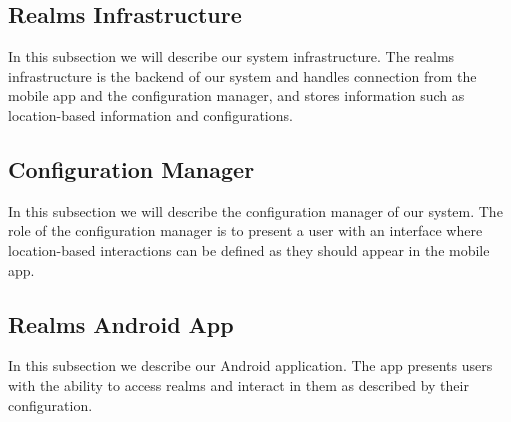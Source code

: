 
\subsection{Realms Infrastructure} %
\label{sub:realms_infrastructure}
In this subsection we will describe our system infrastructure. The realms infrastructure is the backend of our system and handles connection from the mobile app and the configuration manager, and stores information such as location-based information and configurations.

\subsection{Configuration Manager} %
\label{sub:configuration_manager}
In this subsection we will describe the configuration manager of our system. The role of the configuration manager is to present a user with an interface where location-based interactions can be defined as they should appear in the mobile app. 

\subsection{Realms Android App} %
\label{sub:realms_android_app}
In this subsection we describe our Android application. The app presents users with the ability to access realms and interact in them as described by their configuration.
